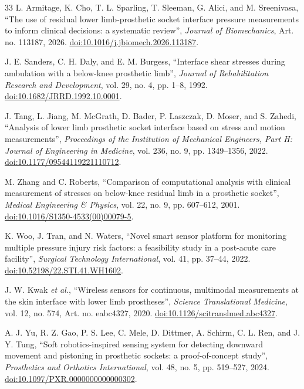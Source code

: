 \begin{thebibliography}{33}
L. Armitage, K. Cho, T. L. Sparling, T. Sleeman, G. Alici, and M. Sreenivasa,
\textquotedblleft The use of residual lower limb-prosthetic socket interface
pressure measurements to inform clinical decisions: a systematic
review\textquotedblright, \textit{Journal of Biomechanics},
Art. no. 113187, 2026.
\href{https://doi.org/10.1016/j.jbiomech.2026.113187}
{doi:10.1016/j.jbiomech.2026.113187}.

J. E. Sanders, C. H. Daly, and E. M. Burgess,
\textquotedblleft Interface shear stresses during ambulation with a below-knee
prosthetic limb\textquotedblright, \textit{Journal of Rehabilitation Research
and Development}, vol. 29, no. 4, pp. 1--8, 1992.
\href{https://doi.org/10.1682/JRRD.1992.10.0001}
{doi:10.1682/JRRD.1992.10.0001}.

J. Tang, L. Jiang, M. McGrath, D. Bader, P. Laszczak, D. Moser, and S. Zahedi,
\textquotedblleft Analysis of lower limb prosthetic socket interface based on
stress and motion measurements\textquotedblright,
\textit{Proceedings of the Institution of Mechanical Engineers, Part H:
Journal of Engineering in Medicine}, vol. 236, no. 9, pp. 1349--1356, 2022.
\href{https://doi.org/10.1177/09544119221110712}
{doi:10.1177/09544119221110712}.

M. Zhang and C. Roberts,
\textquotedblleft Comparison of computational analysis with clinical
measurement of stresses on below-knee residual limb in a prosthetic
socket\textquotedblright, \textit{Medical Engineering \& Physics}, vol. 22,
no. 9, pp. 607--612, 2001.
\href{https://doi.org/10.1016/S1350-4533(00)00079-5}
{doi:10.1016/S1350-4533(00)00079-5}.

K. Woo, J. Tran, and N. Waters,
\textquotedblleft Novel smart sensor platform for monitoring multiple pressure
injury risk factors: a feasibility study in a post-acute care
facility\textquotedblright, \textit{Surgical Technology International},
vol. 41, pp. 37--44, 2022.
\href{https://doi.org/10.52198/22.STI.41.WH1602}
{doi:10.52198/22.STI.41.WH1602}.

J. W. Kwak \textit{et al.},
\textquotedblleft Wireless sensors for continuous, multimodal measurements at
the skin interface with lower limb prostheses\textquotedblright,
\textit{Science Translational Medicine}, vol. 12, no. 574,
Art. no. eabc4327, 2020.
\href{https://doi.org/10.1126/scitranslmed.abc4327}
{doi:10.1126/scitranslmed.abc4327}.

A. J. Yu, R. Z. Gao, P. S. Lee, C. Mele, D. Dittmer, A. Schirm, C. L. Ren,
and J. Y. Tung,
\textquotedblleft Soft robotics-inspired sensing system for detecting downward
movement and pistoning in prosthetic sockets: a proof-of-concept
study\textquotedblright, \textit{Prosthetics and Orthotics International},
vol. 48, no. 5, pp. 519--527, 2024.
\href{https://doi.org/10.1097/PXR.0000000000000302}
{doi:10.1097/PXR.0000000000000302}.


\end{thebibliography}
